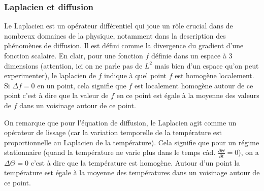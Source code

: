 \documentclass[11pt,a4paper]{article}
\numberwithin{equation}{section}
\theoremstyle{plain}
\theoremstyle{definition}
\theoremstyle{remark}
\newcommand{\Lap}{\Delta}
\begin{document}
\subsubsection{Laplacien et diffusion}
Le Laplacien est un opérateur différentiel qui joue un rôle crucial dans de nombreux domaines de la physique, notamment dans la description des phénomènes de diffusion.
Il est défini comme la divergence du gradient d'une fonction scalaire. 
En clair, pour une fonction $f$ définie dans un espace à 3 dimensions (attention, ici on ne parle pas de $L^2$ mais bien d'un espace qu'on peut experimenter), le laplacien de $f$ indique à quel point $f$ est homogène localement.
Si $\Lap f = 0$ en un point, cela signifie que $f$ est localement homogène autour de ce point c'est à dire que la valeur de $f$ en ce point est égale à la moyenne des valeurs de $f$ dans un voisinage autour de ce point.

On remarque que pour l'équation de diffusion, le Laplacien agit comme un opérateur de lissage (car la variation temporelle de la température est proportionnelle au Laplacien de la température).
Cela signifie que pour un régime stationnaire (quand la température ne varie plus dans le temps càd. $\frac{\partial \Theta}{\partial t} = 0$), on a $\Lap \Theta = 0$ c'est à dire que la température est homogène. Autour d'un point la température est égale à la moyenne des températures dans un voisinage autour de ce point.
\end{document}
